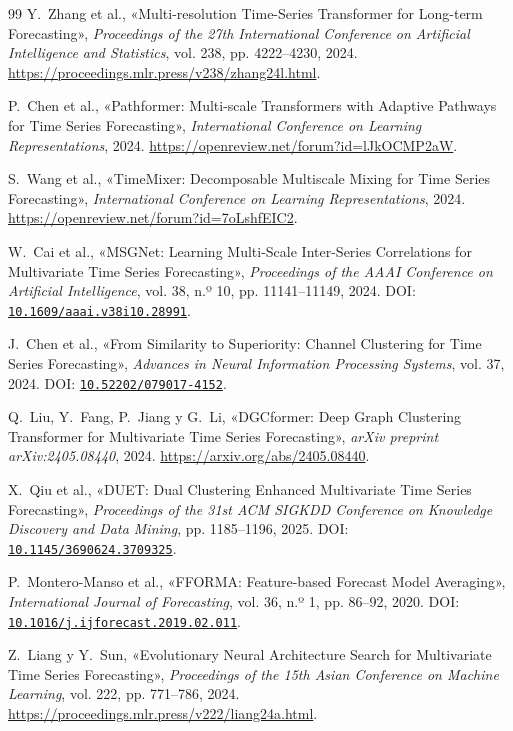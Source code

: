 \documentclass[11pt,letterpaper]{article}
\begin{document}
\begin{thebibliography}{99}
Y.~Zhang et al., «Multi-resolution Time-Series Transformer for Long-term Forecasting», \emph{Proceedings of the 27th International Conference on Artificial Intelligence and Statistics}, vol. 238, pp. 4222--4230, 2024. \url{https://proceedings.mlr.press/v238/zhang24l.html}.

P.~Chen et al., «Pathformer: Multi-scale Transformers with Adaptive Pathways for Time Series Forecasting», \emph{International Conference on Learning Representations}, 2024. \url{https://openreview.net/forum?id=lJkOCMP2aW}.

S.~Wang et al., «{TimeMixer}: Decomposable Multiscale Mixing for Time Series Forecasting», \emph{International Conference on Learning Representations}, 2024. \url{https://openreview.net/forum?id=7oLshfEIC2}.

W.~Cai et al., «{MSGNet}: Learning Multi-Scale Inter-Series Correlations for Multivariate Time Series Forecasting», \emph{Proceedings of the AAAI Conference on Artificial Intelligence}, vol. 38, n.º 10, pp. 11141--11149, 2024. DOI: \href{https://doi.org/10.1609/aaai.v38i10.28991}{\nolinkurl{10.1609/aaai.v38i10.28991}}.

J.~Chen et al., «From Similarity to Superiority: Channel Clustering for Time Series Forecasting», \emph{Advances in Neural Information Processing Systems}, vol. 37, 2024. DOI: \href{https://doi.org/10.52202/079017-4152}{\nolinkurl{10.52202/079017-4152}}.

Q.~Liu, Y.~Fang, P.~Jiang y G.~Li, «DGCformer: Deep Graph Clustering Transformer for Multivariate Time Series Forecasting», \emph{arXiv preprint arXiv:2405.08440}, 2024. \url{https://arxiv.org/abs/2405.08440}.

X.~Qiu et al., «{DUET}: Dual Clustering Enhanced Multivariate Time Series Forecasting», \emph{Proceedings of the 31st ACM SIGKDD Conference on Knowledge Discovery and Data Mining}, pp. 1185--1196, 2025. DOI: \href{https://doi.org/10.1145/3690624.3709325}{\nolinkurl{10.1145/3690624.3709325}}.

P.~Montero-Manso et al., «{FFORMA}: Feature-based Forecast Model Averaging», \emph{International Journal of Forecasting}, vol. 36, n.º 1, pp. 86--92, 2020. DOI: \href{https://doi.org/10.1016/j.ijforecast.2019.02.011}{\nolinkurl{10.1016/j.ijforecast.2019.02.011}}.

Z.~Liang y Y.~Sun, «Evolutionary Neural Architecture Search for Multivariate Time Series Forecasting», \emph{Proceedings of the 15th Asian Conference on Machine Learning}, vol. 222, pp. 771--786, 2024. \url{https://proceedings.mlr.press/v222/liang24a.html}.


\end{thebibliography}
\end{document}
